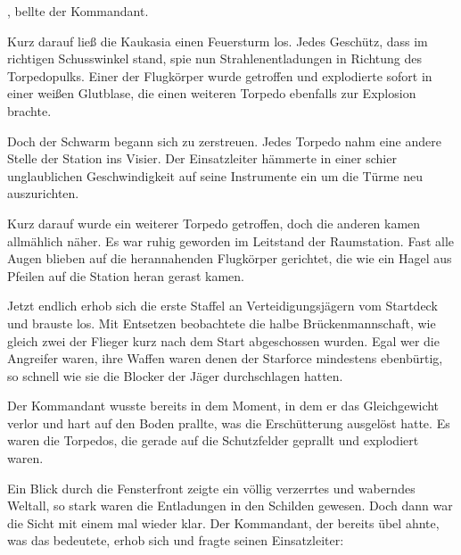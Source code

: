 \par

, bellte der Kommandant. 

\par

Kurz darauf ließ die Kaukasia einen Feuersturm los. Jedes Geschütz, dass im richtigen Schusswinkel stand, spie nun Strahlenentladungen in Richtung des Torpedopulks. Einer der Flugkörper wurde getroffen und explodierte sofort in einer weißen Glutblase, die einen weiteren Torpedo ebenfalls zur Explosion brachte.

\par

Doch der Schwarm begann sich zu zerstreuen. Jedes Torpedo nahm eine andere Stelle der Station ins Visier. Der Einsatzleiter hämmerte in einer schier unglaublichen Geschwindigkeit auf seine Instrumente ein um die Türme neu auszurichten.

\par

Kurz darauf wurde ein weiterer Torpedo getroffen, doch die anderen kamen allmählich näher. Es war ruhig geworden im Leitstand der Raumstation. Fast alle Augen blieben auf die herannahenden Flugkörper gerichtet, die wie ein Hagel aus Pfeilen auf die Station heran gerast kamen.

\par

Jetzt endlich erhob sich die erste Staffel an Verteidigungsjägern vom Startdeck und brauste los. Mit Entsetzen beobachtete die halbe Brückenmannschaft, wie gleich zwei der Flieger kurz nach dem Start abgeschossen wurden. Egal wer die Angreifer waren, ihre Waffen waren denen der Starforce mindestens ebenbürtig, so schnell wie sie die Blocker der Jäger durchschlagen hatten.

\par

Der Kommandant wusste bereits in dem Moment, in dem er das Gleichgewicht verlor und hart auf den Boden prallte, was die Erschütterung ausgelöst hatte. Es waren die Torpedos, die gerade auf die Schutzfelder geprallt und explodiert waren.

\par

Ein Blick durch die Fensterfront zeigte ein völlig verzerrtes und waberndes Weltall, so stark waren die Entladungen in den Schilden gewesen. Doch dann war die Sicht mit einem mal wieder klar. Der Kommandant, der bereits übel ahnte, was das bedeutete, erhob sich und fragte seinen Einsatzleiter: 

